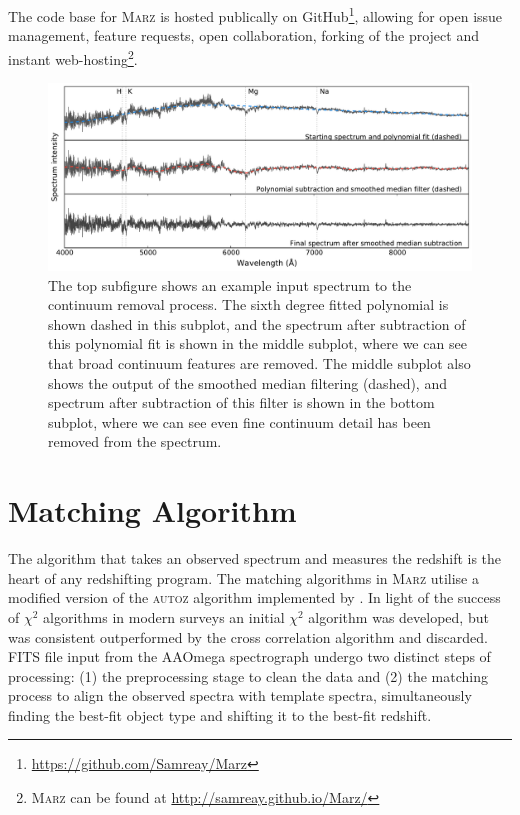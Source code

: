 \documentclass[iop]{emulateapj}
\newcommand{\autoz}{\textsc{autoz}}
\newcommand{\marz}{\textsc{Marz}}
\begin{document}
The code base for \marz{} is hosted publically on GitHub\footnote{\url{https://github.com/Samreay/Marz}}, allowing for open issue management, feature requests, open collaboration, forking of the project and instant web-hosting\footnote{\marz{} can be found at \url{http://samreay.github.io/Marz/}}.



\begin{figure}[t]
\centering
\includegraphics[width=\textwidth]{continuum.pdf}
\caption{The top subfigure shows an example input spectrum to the continuum removal process. The sixth degree fitted polynomial is shown dashed in this subplot, and the spectrum after subtraction of this polynomial fit is shown in the middle subplot, where we can see that broad continuum features are removed. The middle subplot also shows the output of the smoothed median filtering (dashed), and spectrum after subtraction of this filter is shown in the bottom subplot, where we can see even fine continuum detail has been removed from the spectrum.}
\label{fig:continuum}
\end{figure}


\section{Matching Algorithm}

The algorithm that takes an observed spectrum and measures the redshift is the heart of any redshifting program. The matching algorithms in \marz{} utilise a modified version of the \autoz{} algorithm implemented by \citet{baldry2014galaxy}. In light of the success of $\chi^2$ algorithms in modern surveys \cite{bolton2012} an initial $\chi^2$ algorithm was developed, but was consistent outperformed by the cross correlation algorithm and discarded. FITS file input from the AAOmega spectrograph undergo two distinct steps of processing: (1) the preprocessing stage to clean the data and (2) the matching process to align the observed spectra with template spectra, simultaneously finding the best-fit object type and shifting it to the best-fit redshift.\\
\end{document}
